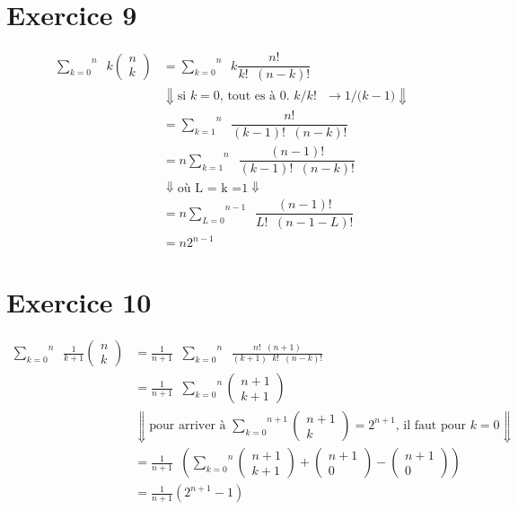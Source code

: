 \documentclass[fontsize=10pt]{article}
\begin{document}
\section*{Exercice 9}
\begin{align*}
\overset{n}{\underset{k= 0}{\sum}}
\phantom{a}k
\begin{pmatrix} 
n\\
k
\end{pmatrix}
& = \overset{n}{\underset{k= 0}{\sum}}
\phantom{a}k\dfrac{n!}{k!\phantom{a}(n-k)!}\\
&\Downarrow\text{si $k=0$, tout es à 0. $k/k!$ $\rightarrow 1/(k-1$)}\Downarrow\\
& = \overset{n}{\underset{k= 1}{\sum}}
\phantom{a}\dfrac{n!}{(k-1)!\phantom{a}(n-k)!}\\
& = n\overset{n}{\underset{k= 1}{\sum}}
\phantom{a}\dfrac{(n-1)!}{(k-1)!\phantom{a}(n-k)!}\\
&\Downarrow\text{où L = k =1}\Downarrow\\
& = n\overset{n-1}{\underset{L= 0}{\sum}}
\phantom{a}\dfrac{(n-1)!}{L!\phantom{a}(n-1-L)!}\\
&= n2^{n-1}
\end{align*}






\section*{Exercice 10}
\begin{align*}
\overset{n}{\underset{k= 0}{\sum}}
\phantom{a}\frac{1}{k+1}
\begin{pmatrix}
n\\
k
\end{pmatrix}
& = \frac{1}{n+1}\phantom{a}
\overset{n}{\underset{k= 0}{\sum}}
\phantom{a}\frac{n!\phantom{a}(n+1)}{(k+1)\phantom{a}k!\phantom{a}(n-k)!}\\
& = \frac{1}{n+1}\phantom{a}
\overset{n}{\underset{k= 0}{\sum}}
\begin{pmatrix}
n+1\\
k+1
\end{pmatrix}\\
& \Downarrow\text{pour arriver à }
\overset{n+1}{\underset{k= 0}{\sum}}
\begin{pmatrix}
n+1\\
k
\end{pmatrix} = 2^{n+1} \text{, il faut pour $k=0$}\Downarrow\\
& = \frac{1}{n+1}\phantom{a}
\left( \overset{n}{\underset{k= 0}{\sum}}
\begin{pmatrix}
n+1\\
k+1
\end{pmatrix} + 
\begin{pmatrix}
n+1\\
0
\end{pmatrix} -
\begin{pmatrix}
n+1\\
0
\end{pmatrix} \right)\\
& = \frac{1}{n+1}(2^{n+1}-1)
\end{align*}
\end{document}
